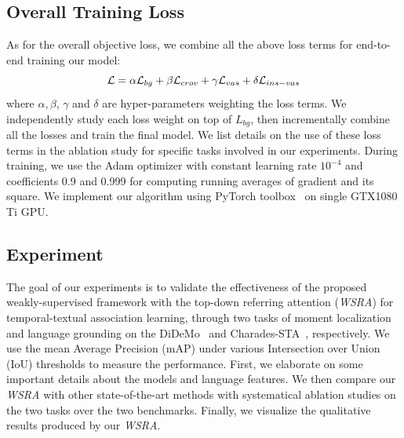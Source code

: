 \subsection{Overall Training Loss}
As for the overall objective loss,
we combine all the above loss terms for end-to-end training our model:
\begin{equation}
    \mathcal{L} = \alpha\mathcal{L}_{bg} + \beta\mathcal{L}_{crov} 
    + \gamma\mathcal{L}_{vas} + \delta\mathcal{L}_{ins-vas} \\
    \label{eq:overall_loss}
\end{equation}
where $\alpha, \beta$, $\gamma$ and $\delta$ are hyper-parameters weighting the loss terms.
We independently study each loss weight on top of $L_{bg}$, 
then incrementally combine all the losses and train the final model.
We list details on the use of these loss terms in the ablation study for specific tasks involved in our experiments.
During training,
we use the Adam optimizer 
with constant learning rate $10^{-4}$ and coefficients 0.9 and 0.999
for computing running averages of gradient and its square.
We implement our algorithm using PyTorch toolbox~\citep{paszke2017automatic} 
on single GTX1080 Ti GPU.

\subsection{Experiment}
The goal of our experiments is to validate the effectiveness of 
the proposed weakly-supervised framework with the top-down referring attention (\textit{WSRA}) 
for temporal-textual association learning,
through two tasks of moment localization and language grounding on
the  DiDeMo~\citep{hendricks2018localizing} and Charades-STA~\citep{gao2017tall},
respectively.
We use the mean Average Precision (mAP) 
under various Intersection over Union (IoU) thresholds to measure the performance. 
First, we elaborate on some important details about the models and language features.
We then compare our \textit{WSRA} with other state-of-the-art methods with
systematical ablation studies on the two tasks over the two benchmarks.
Finally, we visualize the qualitative results produced by our \textit{WSRA}.

